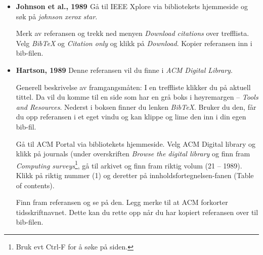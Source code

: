 \documentclass[11pt,norsk,a4paper]{article}
\newcommand{\bt}{BibTeX{}}
\begin{document}
\begin{itemize}
\item\textbf{Johnson et al., 1989 \cite{johnson1989}}\newline 
Gå til IEEE Xplore via bibliotekets hjemmeside og søk på \textit{johnson
xerox star}. 

Merk av referansen og trekk ned menyen \textit{Download citations}
over trefflista. Velg \textit{BibTeX} og \textit{Citation only} og
klikk på \textit{Download}. Kopier referansen inn i
bib-filen.


\item\textbf{Hartson, 1989\cite{hartson1989}}\newline
Denne referansen vil du finne i \textit{ACM Digital Library}.

  Generell beskrivelse av framgangsmåten: I en treffliste klikker du
  på aktuell tittel. Da vil du komme til en side som har en grå boks i
  høyremargen -- \textit{Tools and Resources}. Nederst i boksen finner
  du lenken \textit{\bt}. Bruker du den, får du opp
  referansen i et eget vindu og kan klippe og lime den inn i din egen
  bib-fil.

  Gå til ACM Portal via bibliotekets hjemmeside. Velg ACM Digital
  library og klikk på journals (under overskriften \textit{Browse the
    digital library} og finn fram \textit{Computing
    surveys}\footnote{Bruk evt Ctrl-F for å søke på siden.}, gå til
  arkivet og finn fram riktig volum (21 -- 1989). Klikk på riktig
  nummer (1) og deretter på innholdsfortegnelsen-fanen (Table of
  contents).

Finn fram referansen og se på den. Legg merke til at ACM forkorter
tidsskriftnavnet.  Dette kan du rette opp når du har kopiert
referansen over til bib-filen.




\end{itemize}
\end{document}

